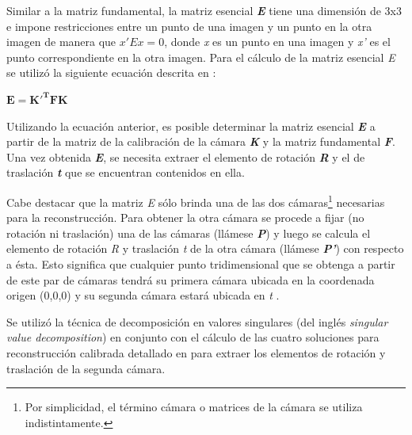 Similar a la matriz fundamental, la matriz esencial \textit{\textbf{E}} tiene una dimensi\'{o}n de 3x3 e impone restricciones entre un punto de una imagen y un punto en la otra imagen de manera que $x'Ex = 0$, donde \textit{x} es un punto en una imagen y \textit{x'} es el punto correspondiente en la otra imagen. Para el c\'{a}lculo de la matriz esencial \textit{E} se utiliz\'{o} la siguiente ecuaci\'{o}n descrita en \cite{Szeliski_2010,Hartley_Zisserman_2003}:


\vspace{5 mm}
\begin{center}
$\mathbf{E = K'^TFK}$
\end{center}
\vspace{5 mm}


Utilizando la ecuaci\'{o}n anterior, es posible determinar la matriz esencial \textit{\textbf{E}} a partir de la matriz de la calibraci\'{o}n de la c\'{a}mara \textit{\textbf{K}} y la matriz fundamental \textit{\textbf{F}}. Una vez obtenida \textit{\textbf{E}}, se necesita extraer el elemento de rotaci\'{o}n \textit{\textbf{R}} y el de traslaci\'{o}n \textit{\textbf{t}} que se encuentran contenidos en ella.

Cabe destacar que la matriz \textit{E} s\'{o}lo brinda una de las dos c\'{a}maras\footnote{Por simplicidad, el t\'{e}rmino c\'{a}mara o matrices de la c\'{a}mara se utiliza indistintamente.} necesarias para la reconstrucci\'{o}n. Para obtener la otra c\'{a}mara se procede a fijar (no rotaci\'{o}n ni traslaci\'{o}n) una de las c\'{a}maras (ll\'{a}mese \textit{\textbf{P}}) y luego se calcula el elemento de rotaci\'{o}n \textit{R} y traslaci\'{o}n \textit{t} de la otra c\'{a}mara (ll\'{a}mese \textit{\textbf{P'}}) con respecto a \'{e}sta. Esto significa que cualquier punto tridimensional que se obtenga a partir de este par de c\'{a}maras tendr\'{a} su primera c\'{a}mara ubicada en la coordenada origen (0,0,0) y su segunda c\'{a}mara estar\'{a} ubicada en \textit{t} \cite{hartley1997triangulation,Hartley_Zisserman_2003}.

Se utiliz\'{o} la t\'{e}cnica de decomposici\'{o}n en valores singulares (del ingl\'{e}s \textit{singular value decomposition}) \cite{Wang_Tsui_2000} en conjunto con el c\'{a}lculo de las cuatro soluciones para reconstrucci\'{o}n calibrada detallado en \cite{Hartley_Zisserman_2003} para extraer los elementos de rotaci\'{o}n y traslaci\'{o}n de la segunda c\'{a}mara.


